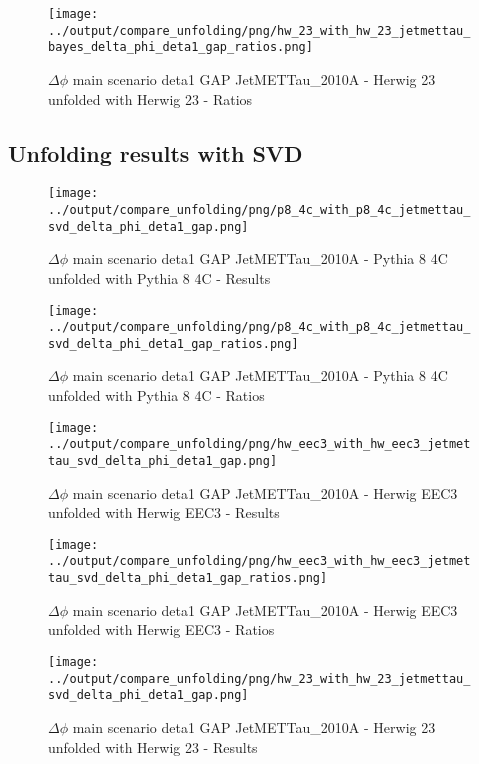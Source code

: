 \documentclass[11pt]{book}
\begin{document}
\begin{figure}[ht]
\centering
\texttt{[image: ../output/compare\_unfolding/png/hw\_23\_with\_hw\_23\_jetmettau\_bayes\_delta\_phi\_deta1\_gap\_ratios.png]}
\caption{$\Delta\phi$ main scenario deta1 GAP JetMETTau\_2010A - Herwig 23 unfolded with Herwig 23 - Ratios}
\label{hw_23_hw_23_jetmettau_bayes_delta_phi_deta1_gap_b}
\end{figure}

\clearpage
\subsection{Unfolding results with SVD}

\begin{figure}[ht]
\centering
\texttt{[image: ../output/compare\_unfolding/png/p8\_4c\_with\_p8\_4c\_jetmettau\_svd\_delta\_phi\_deta1\_gap.png]}
\caption{$\Delta\phi$ main scenario deta1 GAP JetMETTau\_2010A - Pythia 8 4C unfolded with Pythia 8 4C - Results}
\label{p8_p8_jetmettau_svd_delta_phi_deta1_gap_a}
\end{figure}

\begin{figure}[ht]
\centering
\texttt{[image: ../output/compare\_unfolding/png/p8\_4c\_with\_p8\_4c\_jetmettau\_svd\_delta\_phi\_deta1\_gap\_ratios.png]}
\caption{$\Delta\phi$ main scenario deta1 GAP JetMETTau\_2010A - Pythia 8 4C unfolded with Pythia 8 4C - Ratios}
\label{p8_p8_jetmettau_svd_delta_phi_deta1_gap_b}
\end{figure}

\begin{figure}[ht]
\centering
\texttt{[image: ../output/compare\_unfolding/png/hw\_eec3\_with\_hw\_eec3\_jetmettau\_svd\_delta\_phi\_deta1\_gap.png]}
\caption{$\Delta\phi$ main scenario deta1 GAP JetMETTau\_2010A - Herwig EEC3 unfolded with Herwig EEC3 - Results}
\label{hw_eec3_hw_eec3_jetmettau_svd_delta_phi_deta1_gap_a}
\end{figure}

\begin{figure}[ht]
\centering
\texttt{[image: ../output/compare\_unfolding/png/hw\_eec3\_with\_hw\_eec3\_jetmettau\_svd\_delta\_phi\_deta1\_gap\_ratios.png]}
\caption{$\Delta\phi$ main scenario deta1 GAP JetMETTau\_2010A - Herwig EEC3 unfolded with Herwig EEC3 - Ratios}
\label{hw_eec3_hw_eec3_jetmettau_svd_delta_phi_deta1_gap_b}
\end{figure}

\begin{figure}[ht]
\centering
\texttt{[image: ../output/compare\_unfolding/png/hw\_23\_with\_hw\_23\_jetmettau\_svd\_delta\_phi\_deta1\_gap.png]}
\caption{$\Delta\phi$ main scenario deta1 GAP JetMETTau\_2010A - Herwig 23 unfolded with Herwig 23 - Results}
\label{hw_23_hw_23_jetmettau_svd_delta_phi_deta1_gap_a}
\end{figure}
\end{document}
